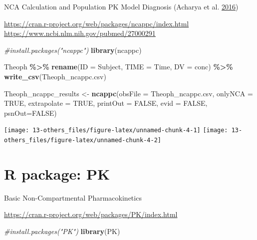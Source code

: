 \documentclass[
  12pt,
]{krantz}
\newenvironment{Shaded}{\begin{snugshade}}{\end{snugshade}}
\newcommand{\CommentTok}[1]{\textcolor[rgb]{0.56,0.35,0.01}{\textit{#1}}}
\newcommand{\DataTypeTok}[1]{\textcolor[rgb]{0.13,0.29,0.53}{#1}}
\newcommand{\KeywordTok}[1]{\textcolor[rgb]{0.13,0.29,0.53}{\textbf{#1}}}
\newcommand{\NormalTok}[1]{#1}
\newcommand{\OperatorTok}[1]{\textcolor[rgb]{0.81,0.36,0.00}{\textbf{#1}}}
\newcommand{\OtherTok}[1]{\textcolor[rgb]{0.56,0.35,0.01}{#1}}
\newcommand{\StringTok}[1]{\textcolor[rgb]{0.31,0.60,0.02}{#1}}
\begin{document}
NCA Calculation and Population PK Model Diagnosis (Acharya et al. \protect\hyperlink{ref-Acharya201683}{2016})

\url{https://cran.r-project.org/web/packages/ncappc/index.html}
\url{https://www.ncbi.nlm.nih.gov/pubmed/27000291}

\begin{Shaded}
\begin{Highlighting}[]
\CommentTok{\#install.packages("ncappc")}
\KeywordTok{library}\NormalTok{(ncappc)}
\end{Highlighting}
\end{Shaded}

\begin{Shaded}
\begin{Highlighting}[]
\NormalTok{Theoph }\OperatorTok{\%\textgreater{}\%}\StringTok{ }
\StringTok{  }\KeywordTok{rename}\NormalTok{(}\DataTypeTok{ID =}\NormalTok{ Subject,}
         \DataTypeTok{TIME =}\NormalTok{ Time,}
         \DataTypeTok{DV =}\NormalTok{ conc) }\OperatorTok{\%\textgreater{}\%}\StringTok{ }
\StringTok{  }\KeywordTok{write\_csv}\NormalTok{(}\StringTok{\textquotesingle{}Theoph\_ncappc.csv\textquotesingle{}}\NormalTok{)}

\NormalTok{Theoph\_ncappc\_results \textless{}{-}}\StringTok{ }\KeywordTok{ncappc}\NormalTok{(}\DataTypeTok{obsFile =} \StringTok{\textquotesingle{}Theoph\_ncappc.csv\textquotesingle{}}\NormalTok{,}
       \DataTypeTok{onlyNCA =} \OtherTok{TRUE}\NormalTok{,}
       \DataTypeTok{extrapolate =} \OtherTok{TRUE}\NormalTok{,}
       \DataTypeTok{printOut =} \OtherTok{FALSE}\NormalTok{,}
       \DataTypeTok{evid =} \OtherTok{FALSE}\NormalTok{,}
       \DataTypeTok{psnOut=}\OtherTok{FALSE}\NormalTok{)}
\end{Highlighting}
\end{Shaded}

\texttt{[image: 13-others\_files/figure-latex/unnamed-chunk-4-1]}
\texttt{[image: 13-others\_files/figure-latex/unnamed-chunk-4-2]}

\hypertarget{r-package-pk}{%
\section{R package: PK}\label{r-package-pk}}

Basic Non-Compartmental Pharmacokinetics

\url{https://cran.r-project.org/web/packages/PK/index.html}

\begin{Shaded}
\begin{Highlighting}[]
\CommentTok{\#install.packages("PK")}
\KeywordTok{library}\NormalTok{(PK)}
\end{Highlighting}
\end{Shaded}
\end{document}
